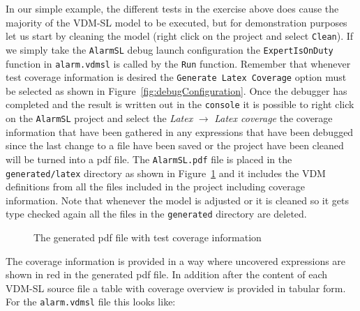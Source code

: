 In our simple example, the different tests in the exercise above does
cause the majority of the VDM-SL model to be executed, but for
demonstration purposes let us start by cleaning the model (right click
on the project and select \texttt{Clean}). If we simply take the
\texttt{AlarmSL} debug launch configuration the
\verb|ExpertIsOnDuty| function in \verb|alarm.vdmsl| is called by the
\texttt{Run} function. Remember that whenever test coverage
information is desired the \texttt{Generate Latex Coverage} option
must be selected as shown in Figure~\ref{fig:debugConfiguration}. 
Once the debugger has completed and the result
is written out in the \texttt{console} it is possible to right click
on the \texttt{AlarmSL} project and select the \emph{Latex} $
\rightarrow $ \emph{Latex coverage} the coverage information that have
been gathered in any expressions that have been debugged since the
last change to a file have been saved or the project have been cleaned
will be turned into a pdf file. The \texttt{AlarmSL.pdf} file is
placed in the \texttt{generated/latex} directory as shown in
Figure~\ref{fig:testcov} and it includes the
VDM definitions from all the files included in the project including
coverage information. Note that whenever the model is adjusted or it
is cleaned so it gets type checked again all the files in the
\texttt{generated} directory are deleted.

\begin{figure}[tb]
\begin{center}
\end{center}
\caption{The generated pdf file with test coverage information\label{fig:testcov}}
\end{figure}

The coverage information is provided in a way where uncovered
expressions are shown in red in the generated pdf file. In addition
after the content of each VDM-SL source file a table with coverage
overview is provided in tabular form. For the \texttt{alarm.vdmsl}
file this looks like:

